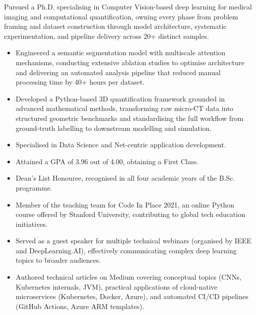 \documentclass[12pt,a4paper,withhyper]{altacv}
\begin{document}
\medskip


Pursued a Ph.D. specialising in Computer Vision-based deep learning for medical imaging and computational quantification, owning every phase from problem framing and dataset construction through model architecture, systematic experimentation, and pipeline delivery across 20+ distinct samples.
\begin{itemize}
    \item Engineered a semantic segmentation model with multiscale attention mechanisms, conducting extensive ablation studies to optimise architecture and delivering an automated analysis pipeline that reduced manual processing time by 40+ hours per dataset.
    \item Developed a Python-based 3D quantification framework grounded in advanced mathematical methods, transforming raw micro-CT data into structured geometric benchmarks and standardising the full workflow from ground-truth labelling to downstream modelling and simulation.
\end{itemize}

\divider{}

\begin{itemize}
    \item Specialised in Data Science and Net-centric application development.
    \item Attained a GPA of 3.96 out of 4.00, obtaining a First Class.
    \item Dean’s List Honouree, recognised in all four academic years of the B.Sc. programme.
\end{itemize}

\medskip

\begin{itemize}
    \item Member of the teaching team for Code In Place 2021, an online Python course offered by Stanford University, contributing to global tech education initiatives.
    \item Served as a guest speaker for multiple technical webinars (organised by IEEE and DeepLearning.AI), effectively communicating complex deep learning topics to broader audiences.
    \item  Authored technical articles on Medium covering conceptual topics (CNNs, Kubernetes internals, JVM), practical applications of cloud-native microservices (Kubernetes, Docker, Azure), and automated CI/CD pipelines (GitHub Actions, Azure ARM templates).
\end{itemize}
\end{document}
